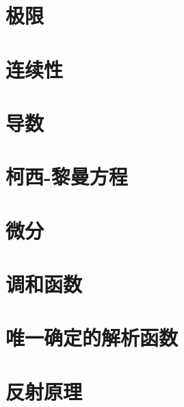 \documentclass[UTF8]{article}
\begin{document}
    \section{极限}
    \section{连续性}
    \section{导数}
    \section{柯西-黎曼方程}
    \section{微分}
    \section{调和函数}
    \section{唯一确定的解析函数}
    \section{反射原理}
\end{document}
